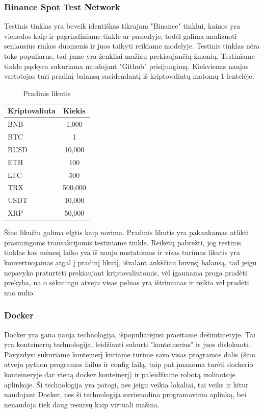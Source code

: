 \documentclass{VUMIFInfKursinis}
\begin{document}
\subsubsection{Binance Spot Test Network}
Testinis tinklas yra beveik identiškas tikrajam "Binance" tinklui, kainos yra vienodos kaip ir pagrindiniame tinkle ar pasaulyje, todėl galima analizuoti 
seniausius rinkos duomenis ir juos taikyti reikiame modelyje. Testinis tinklas nėra toks populiarus, tad jame yra ženkliai mažiau prekiaujančių žmonių. 
Testiniame tinkle pąskyra sukuriama naudojant "Github" prisijungimą. Kiekvienas naujas vartotojas turi pradinį balansą susidendantį iš kriptovaliutų
matomų 1 lentelėje.

\begin{table}[H]\footnotesize
  \centering
  \caption{Pradinis likutis}    %
  {\begin{tabular}{|l|c|} \hline
      Kriptovaliuta & Kiekis  \\
      \hline
      BNB           & 1,000   \\
      BTC           & 1       \\
      BUSD          & 10,000  \\
      ETH           & 100     \\
      LTC           & 500     \\
      TRX           & 500,000 \\
      USDT          & 10,000  \\
      XRP           & 50,000  \\
      \hline 
    \end{tabular}}
\end{table}

Šiuo likučiu galima elgtis kaip norima. Pradinis likutis yra pakankamas atlikti prasmingoms transakcijomis testiniame tinkle. Reikėtų pabrėžti, jog testinis
tinklas kas mėnesį laiko yra iš naujo nustatomas ir visas turimas likutis yra konvertuojamas atgal į pradinį likutį, išvalant ankščiau buvusį balansą, tad jeigu
nepavyko praturtėti prekiaujant kriptovaliutomis, vėl įgaunama proga pradėti prekyba, na o sėkmingu atveju visas pelnas yra ištrinamas ir reikia vėl pradėti
nuo nulio.


\subsubsection{Docker}
Docker yra gana nauja technologija, išpopuliarėjusi praeitame dešimtmetyje. Tai yra konteinerių technologija, leidžianti sukurti "konteinerius" ir 
juos dislokuoti. Pavyzdys: sukuriame konteinerį kuriame turime savo visas programos dalis 
(šiuo atveju python programos failus ir config failą, taip pat įmanoma turėti
dockerio konteineryje dar vieną docker konteinerį) ir paleidžiame robotą izoliuotoje aplinkoje. 
Ši technologija yra patogi, nes jeigu veikia lokaliai, tai veiks ir kitur naudojant Docker, nes ši technologija
suvienodina programavimo aplinką, bei nenaudoja tiek daug resursų kaip virtuali mašina.
\end{document}
